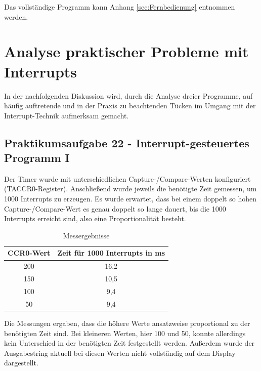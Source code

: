\documentclass[12pt,a4paper,bibliography=totocnumbered,listof=totocnumbered]{scrartcl}
\begin{document}
\vspace{1em}
Das vollständige Programm kann Anhang \ref{sec:Fernbedienung} entnommen werden.
 
\pagebreak



\section{Analyse praktischer Probleme mit Interrupts}
In der nachfolgenden Diskussion wird, durch die Analyse dreier Programme, auf häufig auftretende und in der Praxis zu beachtenden Tücken im Umgang mit der Interrupt-Technik aufmerksam gemacht.

\subsection{Praktikumsaufgabe 22 - Interrupt-gesteuertes Programm I}
Der Timer wurde mit unterschiedlichen Capture-/Compare-Werten konfiguriert (TACCR0-Register). Anschließend wurde jeweils die benötigte Zeit gemessen, um 1000 Interrupts zu erzeugen. Es wurde erwartet, dass bei einem doppelt so hohen Capture-/Compare-Wert es genau doppelt so lange dauert, bis die 1000 Interrupts erreicht sind, also eine Proportionalität besteht.

\begin{table}[!htb]
	\centering
	\begin{tabular}{@{}c|c@{}}
		\toprule
		CCR0-Wert & Zeit für 1000 Interrupts in ms \\ \midrule
		200       & 16,2                           \\
		150       & 10,5                           \\
		100       & 9,4                            \\
		50        & 9,4                            \\ \bottomrule
	\end{tabular}
	\caption{Messergebnisse}
\end{table}

Die Messungen ergaben, dass die höhere Werte ansatzweise proportional zu der benötigten Zeit sind. Bei kleineren Werten, hier 100 und 50, konnte allerdings kein Unterschied in der benötigten Zeit festgestellt werden. Außerdem wurde der Ausgabestring \glqq aktuell \grqq{} bei diesen Werten nicht vollständig auf dem Display dargestellt.
\end{document}
